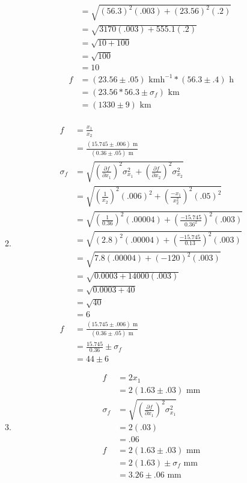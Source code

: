 \documentclass{article}
\begin{document}
\begin{enumerate}
\begin{enumerate}
\begin{align*}
&= \sqrt{(56.3)^2(.003) + (23.56)^2(.2)}\\
&= \sqrt{3170(.003) + 555.1(.2)}\\
&= \sqrt{10 + 100}\\
&= \sqrt{100}\\
&= 10\\
f &= (23.56 \pm .05)\text{ kmh}^{-1} * (56.3 \pm .4)\text{ h}\\
&= (23.56 * 56.3 \pm \sigma_{f})\text{ km}\\
&= (1330 \pm 9)\text{ km}\\
\end{align*}
\item
\begin{align*}
f &= \frac{x_{1}}{x_{2}}\\
&= \frac{(15.745 \pm .006)\text{ m}}{(0.36 \pm .05)\text{ m}}\\
\sigma_{f} &= \sqrt{(\frac{\partial f}{\partial x_{1}})^2\sigma_{x_{1}}^2 + (\frac{\partial f}{\partial x_{2}})^2\sigma_{x_{2}}^2}\\
&= \sqrt{(\frac{1}{x_{2}})^2(.006)^2 + (\frac{-x_{1}}{x_{2}^2})^2(.05)^2}\\
&= \sqrt{(\frac{1}{0.36})^2(.00004) + (\frac{-15.745}{0.36^2})^2(.003)}\\
&= \sqrt{(2.8)^2(.00004) + (\frac{-15.745}{0.13})^2(.003)}\\
&= \sqrt{7.8(.00004) + (-120)^2(.003)}\\
&= \sqrt{0.0003 + 14000(.003)}\\
&= \sqrt{0.0003 + 40}\\
&= \sqrt{40}\\
&= 6\\
f &= \frac{(15.745 \pm .006)\text{ m}}{(0.36 \pm .05)\text{ m}}\\
&= \frac{15.745}{0.36} \pm \sigma_{f}\\
&= 44 \pm 6
\end{align*}
\item
\begin{align*}
f &= 2x_{1}\\
&= 2(1.63 \pm .03)\text{ mm}\\
\sigma_{f} &= \sqrt{(\frac{\partial f}{\partial x_{1}})^2\sigma_{x_{1}}^2}\\
&= 2(.03)\\
&= .06\\
f &= 2(1.63 \pm .03)\text{ mm}\\
&= 2(1.63) \pm \sigma_{f}\text{ mm}\\
&= 3.26 \pm .06\text{ mm}\\

\end{align*}
\end{enumerate}
\end{enumerate}
\end{document}
